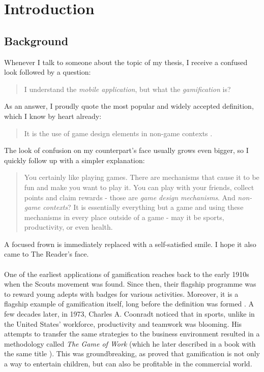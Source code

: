 \chapter{Introduction}\label{ch:introduction}
\section{Background}\label{sec:introduction:background}
Whenever I talk to someone about the topic of my thesis, I receive a confused look followed by a question:
\begin{quotation}
   I understand the \textit{mobile application}, but what the \textit{gamification} is?
\end{quotation}

As an answer, I proudly quote the most popular and widely accepted definition, which I know by heart already:
\begin{quotation}
    It is the use of game design elements in non-game contexts \cite{deterdingGamificationDefinition2011}.
\end{quotation}
The look of confusion on my counterpart's face usually grows even bigger, so I quickly follow up with a simpler explanation:
\begin{quotation}
    You certainly like playing games. There are mechanisms that cause it to be fun and make you want to play it. You can play with your friends, collect points and claim rewards - those are \textit{game design mechanisms}. And \textit{non-game contexts}? It is essentially everything but a game and using these mechanisms in every place outside of a game - may it be sports, productivity, or even health.
\end{quotation}
A focused frown is immediately replaced with a self-satisfied smile. I hope it also came to The Reader's face.
\\\\
One of the earliest applications of gamification reaches back to the early 1910s when the Scouts movement was found. Since then, their flagship programme was to reward young adepts with badges for various activities. Moreover, it is a flagship example of gamification itself, long before the definition was formed \cite{geraldchristiansOriginsFutureGamification,deterdingGamificationDesigningMotivation2012}. A few decades later, in 1973, Charles A. Coonradt noticed that in sports, unlike in the United States' workforce, productivity and teamwork was blooming. His attempts to transfer the same strategies to the business environment resulted in a methodology called \textit{The Game of Work} (which he later described in a book with the same title \cite{coonradtGameWork2012}). This was groundbreaking, as proved that gamification is not only a way to entertain children, but can also be profitable in the commercial world. 
